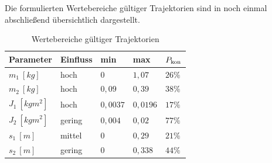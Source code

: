 Die formulierten Wertebereiche gültiger Trajektorien sind in  noch einmal abschließend übersichtlich dargestellt. 

\begin{table}[h]
	\centering
	\caption{Wertebereiche gültiger Trajektorien}
		\begin{tabular}{lllll}
			\toprule
			Parameter  & Einfluss & min & max & $P_{\mathrm{kon}}$ \\
			\midrule
			{$m_1 \ [\unit{kg}]$}  &  hoch & $0$ & $1,07$  & $26 \%$ \\
			\midrule			
			$m_2 \ [\unit{kg}]$  &  hoch & $0,09$ & $0,39$  & $38 \%$ \\	
			\midrule
			$J_1 \ [\unit{kg m^2}]$  &  hoch & $0,0037$ & $0,0196$  & $17 \%$ \\
		  \midrule
			$J_2 \ [\unit{kg m^2}]$ & gering & $0,004$ & $0,02$  & $77 \%$ \\
			\midrule
			$s_1 \ [\unit{m}]$   &   mittel & $0$ & $0,29$  & $21 \%$ \\
			\midrule
			$s_2 \ [\unit{m}]$   &   gering & $0$ & $0,338$  & $44 \%$ \\
			\bottomrule
		\end{tabular}
	\label{tab:Bereichsempfehlungen}
\end{table}


